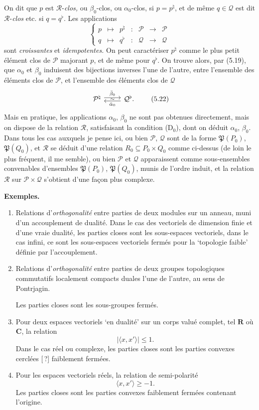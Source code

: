 \documentclass[11pt]{article}
\newcommand{\msp}[1]{\marginpar{\footnotesize [#1]}}
\newcommand{\cP}{\mathcal{P}}
\newcommand{\cQ}{\mathcal{Q}}
\newcommand{\cR}{\mathcal{R}}
\newcommand{\fP}{\mathfrak{P}}
\begin{document}
On dit que $p$ est $\cR$-\textit{clos,} ou $\beta_0$-clos, ou $\alpha_0$-clos, si $p = p^{\natural}$, et de même $q \in \cQ$ est dit $\cR$-\textit{clos} etc. si $q = q^{\flat}$. Les applications
\[
\left\{
\begin{array}{ccccccc}
p & \longmapsto & p^{\natural} & : & \cP & \longrightarrow & \cP\\[1ex]
q & \longmapsto & q^{\flat} & : & \cQ & \longrightarrow & \cQ
\end{array}
\right.
\tag*{(5.21)}
\]
sont \textit{croissantes} et \textit{idempotentes.} On peut caractériser $p^{\natural}$ comme le plus petit élément clos de $\cP$ majorant $p$, et de même pour $q^{\flat}$. On trouve alors, par (5.19), que $\alpha_0$ et $\beta_0$ induisent des bijections inverses l'une de l'autre,
\msp{78}
entre l'ensemble des éléments clos de $\cP$, et l'ensemble des éléments clos de $\cQ$
\[
\begin{tikzcd}
\cP^{\natural} \arrow[r, shift left, "\bar{\beta}_0"] \arrow[r, phantom, "\scriptstyle\sim"] & \cQ^{\flat}. \arrow[l, shift left, "\bar{\alpha}_0"]
\end{tikzcd}
\tag*{(5.22)}
\]
Mais en pratique, les applications $\alpha_0$, $\beta_0$ ne sont pas obtenues directement, mais on dispose de la relation $\cR$, satisfaisant la condition (D$_0$), dont on déduit $\alpha_0$, $\beta_0$. Dans tous les cas auxquels je pense ici, ou bien $\cP$, $\cQ$ sont de la forme $\fP(P_0)$, $\fP(Q_0)$, et $\cR$ se déduit d'une relation $R_0 \subseteq P_0 \times Q_0$ comme ci-dessus (de loin le plus fréquent, il me semble), ou bien $\cP$ et $\cQ$ apparaissent comme sous-ensembles convenables d'ensembles $\fP(P_0)$, $\fP(Q_0)$, munis de l'ordre induit, et la relation $\cR$ sur $\cP \times \cQ$ s'obtient d'une façon plus complexe.

\noindent\textbf{Exemples.}
\begin{enumerate}[label={\arabic*)}]
\item Relations d'\textit{orthogonalité} entre parties de deux modules sur un anneau, muni d'un accouplement de dualité. Dans le cas des vectoriels de dimension finie et d'une vraie dualité, les parties closes sont les sous-espaces vectoriels, dans le cas infini, ce sont les sous-espaces vectoriels fermés pour la `topologie faible' définie par l'accouplement.
\item Relations d'\textit{orthogonalité} entre parties de deux groupes topologiques commutatifs localement compacts duales l'une de l'autre, au sens de Pontrjagin.
\msp{79}

Les parties closes sont les sous-groupes fermés.
\item Pour deux espaces vectoriels `en dualité' sur un corps valué complet, tel $\mathbf{R}$ où $\mathbf{C}$, la relation %
\[
|\langle x, x' \rangle| \leq 1.
\]
Dans le cas réel ou complexe, les parties closes sont les parties convexes cerclées [\,?] faiblement fermées.
\item Pour les espaces vectoriels réels, la relation de semi-polarité
\[
\langle x, x' \rangle \geq -1.
\]
Les parties closes sont les parties convexes faiblement fermées contenant l'origine.
\end{enumerate}
\end{document}
